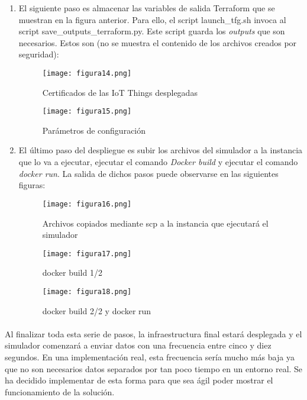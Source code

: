 \documentclass[../../memoria.tex]{subfiles}
\begin{document}
\begin{enumerate}
    \item El siguiente paso es almacenar las variables de salida Terraform que se muestran en la figura anterior. Para ello, el script launch\_tfg.sh invoca al script save\_outputs\_terraform.py. Este script guarda los \textit{outputs} que son necesarios. Estos son (no se muestra el contenido de los archivos creados por seguridad):
          \begin{figure}[H]
              \centering
              \texttt{[image: figura14.png]}
              \caption{Certificados de las IoT Things desplegadas}
              \label{fig:figura14}
          \end{figure}

          \begin{figure}[H]
              \centering
              \texttt{[image: figura15.png]}
              \caption{Parámetros de configuración}
              \label{fig:figura15}
          \end{figure}

    \item El último paso del despliegue es subir los archivos del simulador a la instancia que lo va a ejecutar, ejecutar el comando \textit{Docker build} y ejecutar el comando \textit{docker run}. La salida de dichos pasos puede observarse en las siguientes figuras:
          \begin{figure}[H]
              \centering
              \texttt{[image: figura16.png]}
              \caption{Archivos copiados mediante scp a la instancia que ejecutará el simulador}
              \label{fig:figura16}
          \end{figure}
          \begin{figure}[H]
              \centering
              \texttt{[image: figura17.png]}
              \caption{docker build 1/2}
              \label{fig:figura17}
          \end{figure}
          \begin{figure}[H]
              \centering
              \texttt{[image: figura18.png]}
              \caption{docker build 2/2 y docker run}
              \label{fig:figura18}
          \end{figure}
\end{enumerate}

\paragraph{}
Al finalizar toda esta serie de pasos, la infraestructura final estará desplegada y el simulador comenzará a enviar datos con una frecuencia entre cinco y diez segundos. En una implementación real, esta frecuencia sería mucho más baja ya que no son necesarios datos separados por tan poco tiempo en un entorno real. Se ha decidido implementar de esta forma para que sea ágil poder mostrar el funcionamiento de la solución.
\end{document}
